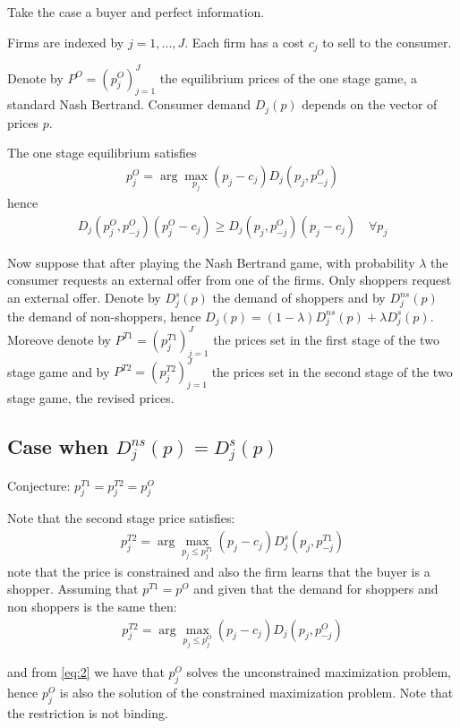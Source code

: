 \documentclass[12pt]{article}
\begin{document}
Take the case a buyer and perfect information. 

Firms are indexed by $j=1,...,J$. Each firm has a cost $c_j$ to sell to the consumer. 

Denote by $P^O = (p_j^O)_{j=1}^J$ the equilibrium prices of the one stage game, a standard Nash Bertrand. Consumer demand $D_j(p)$ depends on the vector of prices $p$. 

The one stage equilibrium satisfies 
\begin{align}\label{eq:1}
    p_j^O = \arg \max_{p_j} (p_j - c_j) D_j(p_j, p_{-j}^O)
\end{align}
hence 
\begin{align}\label{eq:2}
    D_j(p_j^O, p_{-j}^O) (p_j^O - c_j) \geq D_j(p_j, p_{-j}^O) (p_j - c_j) \quad \forall p_j
\end{align}

\vspace{1cm}

Now suppose that after playing the Nash Bertrand game, with probability $\lambda$ the consumer requests an external offer from one of the firms. Only shoppers request an external offer. Denote by $D_j^s(p)$ the demand of shoppers and by $D_j^{ns}(p)$ the demand of non-shoppers, hence $D_j(p) = (1-\lambda) D_j^{ns}(p) + \lambda D_j^s(p)$.
Moreove denote by $P^{T1} = (p_j^{T1})_{j=1}^J$ the prices set in the first stage of the two stage game and by $P^{T2} = (p_j^{T2})_{j=1}^J$ the prices set in the second stage of the two stage game, the revised prices. 

\subsection{Case when $D_j^{ns}(p) = D_j^s(p)$}


Conjecture: $p_j^{T1} =p_j^{T2} = p_j^O$ 

Note that the second stage price satisfies: 
\begin{align}\label{eq:3}
    p_j^{T2} = \arg \max_{p_j \leq p_j^{T1}} (p_j - c_j) D_j^s(p_j, p_{-j}^{T1})
\end{align}
note that the price is constrained and also the firm learns that the buyer is a shopper. Assuming that $p^{T1} = p^O$ and given that the demand for shoppers and non shoppers is the same then: 
\begin{align}
    p_j^{T2} = \arg \max_{p_j \leq p_j^{O}} (p_j - c_j) D_j(p_j, p_{-j}^{O})
\end{align}

and from \ref{eq:2} we have that $p_j^O$ solves the unconstrained maximization problem, hence $p_j^O$ is also the solution of the constrained maximization problem. Note that the restriction is not binding. 
\end{document}
